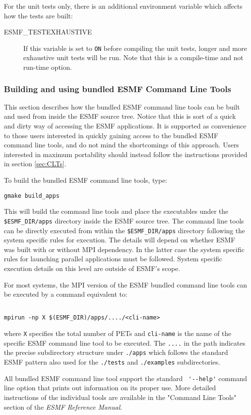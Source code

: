 For the unit tests only, there is an additional environment variable
which affects how the tests are built:
\begin{description}
\item[ESMF\_TESTEXHAUSTIVE]
If this variable is set to {\tt ON} before compiling the unit tests,
longer and more exhaustive unit tests will be run.  Note that this is a
compile-time and not run-time option.
\end{description}


\subsubsection{Building and using bundled ESMF Command Line Tools}
\label{quickapps}

This section describes how the bundled ESMF command line tools can be built
and used from inside the ESMF source tree. Notice that this is sort of a quick
and dirty way of accessing the ESMF applications. It is supported as
convenience to those users interested in quickly gaining access to the bundled
ESMF command line tools, and do not mind the shortcomings of this approach.
Users interested in maximum portability should instead follow the instructions
provided in section \ref{sec:CLTs}.

To build the bundled ESMF command line tools, type:
\begin{verbatim}
gmake build_apps
\end{verbatim}
This will build the command line tools and place the executables under the 
{\tt \$ESMF\_DIR/apps} directory inside the ESMF source tree. The 
command line tools can be directly executed from within the
{\tt \$ESMF\_DIR/apps} directory following the system specific rules for
execution. The details will depend on whether ESMF was built with or without
MPI dependency. In the latter case the system specific rules for launching
parallel applications must be followed. System specific execution details on
this level are outside of ESMF's scope.

For most systems, the MPI version of the ESMF bundled command line tools can be 
executed by a command equivalent to:

\begin{verbatim}

mpirun -np X $(ESMF_DIR)/apps/..../<cli-name>

\end{verbatim}
 
where {\tt X} specifies the total number of PETs and {\tt cli-name} is the 
name of the specific ESMF command line tool to be executed. The {\tt ....} in
the path indicates the precise subdirectory structure under {\tt ./apps} which
follows the standard ESMF pattern also used for the {\tt ./tests} and
{\tt ./examples} subdirectories.

All bundled ESMF command line tool support the standard \verb+ '--help'+ command
line option that prints out information on its proper use. More detailed
instructions of the individual tools are available in the "Command Line Tools"
section of the {\it ESMF Reference Manual}.

